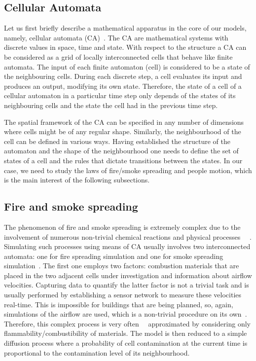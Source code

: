 \subsection{Cellular Automata}
Let us first briefly describe a mathematical apparatus in the core of our
models, namely, cellular automata (CA)~\cite{Wolfram}.
The CA are mathematical systems with discrete values in space, time and
state.
With respect to the structure a CA can be considered as a grid of locally
interconnected cells that behave like finite automata.
The input of each finite automaton (cell) is considered to be a state of the
neighbouring cells.
During each discrete step, a cell evaluates its input and produces an
output, modifying its own state.
Therefore, the state of a cell of a cellular automaton in a particular time
step only depends of the states of its neighbouring cells and the state the
cell had in the previous time step.

The spatial framework of the CA can be specified in any number of dimensions
where cells might be of any regular shape.
Similarly, the neighbourhood of the cell can be defined in various ways.
Having established the structure of the automaton and the shape of the
neighbourhood one needs to define the set of states of a cell and the rules
that dictate transitions between the states.
In our case, we need to study the laws of fire/smoke spreading and people
motion, which is the main interest of the following subsections.

\subsection{Fire and smoke spreading}
The phenomenon of fire and smoke spreading is extremely complex due to the
involvement of numerous non-trivial chemical reactions and physical processes
~\cite{Ying}~\cite{Curiac}.
Simulating such processes using means of CA usually involves two interconnected
automata: one for fire spreading simulation and one for smoke spreading
simulation~\cite{Curiac}.
The first one employs two factors: combustion materials that are placed in the
two adjacent cells under investigation and information about airflow velocities.
Capturing data to quantify the latter factor is not a trivial task and is
usually performed by establishing a sensor network to measure these velocities
real-time.
This is impossible for buildings that are being planned, so, again, simulations
of the airflow are used, which is a non-trivial procedure on its
own~\cite{Airflow}.
Therefore, this complex process is very often~\cite{Tissera1}~\cite{Tissera2}
approximated by considering only flammability/combustibility of materials.
The model is then reduced to a simple diffusion process where a probability of
cell contamination at the current time is proportional to the contamination
level of its neighbourhood.

